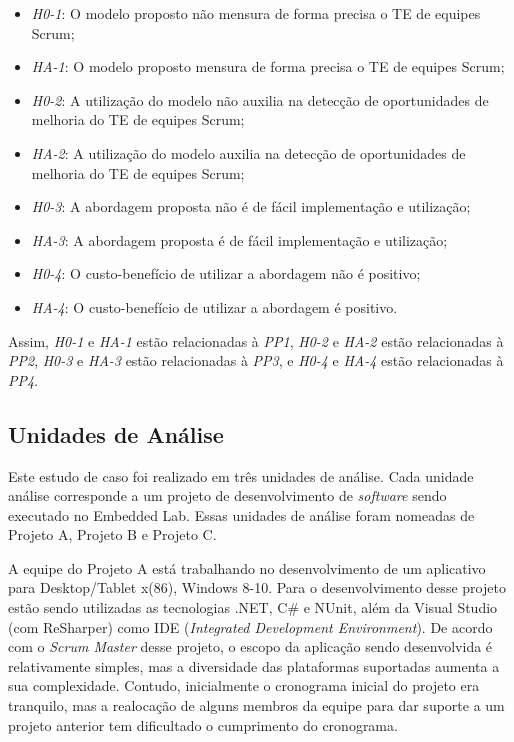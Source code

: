 \begin{itemize}
  \item \textit{H0-1}: O modelo proposto não mensura de forma precisa o TE de equipes Scrum;
  \item \textit{HA-1}: O modelo proposto mensura de forma precisa o TE de equipes Scrum;
  \item \textit{H0-2}: A utilização do modelo não auxilia na detecção de oportunidades de melhoria do TE de equipes Scrum;
  \item \textit{HA-2}: A utilização do modelo auxilia na detecção de oportunidades de melhoria do TE de equipes Scrum;
  \item \textit{H0-3}: A abordagem proposta não é de fácil implementação e utilização;
  \item \textit{HA-3}: A abordagem proposta é de fácil implementação e utilização;
  \item \textit{H0-4}: O custo-benefício de utilizar a abordagem não é positivo;
  \item \textit{HA-4}: O custo-benefício de utilizar a abordagem é positivo.
\end{itemize}

Assim, \textit{H0-1} e \textit{HA-1} estão relacionadas à \textit{PP1}, \textit{H0-2} e \textit{HA-2} estão relacionadas à \textit{PP2}, \textit{H0-3} e \textit{HA-3} estão relacionadas à \textit{PP3}, e \textit{H0-4} e \textit{HA-4} estão relacionadas à \textit{PP4}.

\subsection{Unidades de Análise}
\label{estudodecaso:design:unidades}

Este estudo de caso foi realizado em três unidades de análise. Cada unidade análise corresponde a um projeto de desenvolvimento de \textit{software} sendo executado no Embedded Lab. Essas unidades de análise foram nomeadas de Projeto A, Projeto B e Projeto C.

A equipe do Projeto A está trabalhando no desenvolvimento de um aplicativo para Desktop/Tablet x(86), Windows 8-10. Para o desenvolvimento desse projeto estão sendo utilizadas as tecnologias .NET, C\# e NUnit, além da Visual Studio (com ReSharper) como IDE (\textit{Integrated Development Environment}). De acordo com o \textit{Scrum Master} desse projeto, o escopo da aplicação sendo desenvolvida é relativamente simples, mas a diversidade das plataformas suportadas aumenta a sua complexidade. Contudo, inicialmente o cronograma inicial do projeto era tranquilo, mas a realocação de alguns membros da equipe para dar suporte a um projeto anterior tem dificultado o cumprimento do cronograma.

